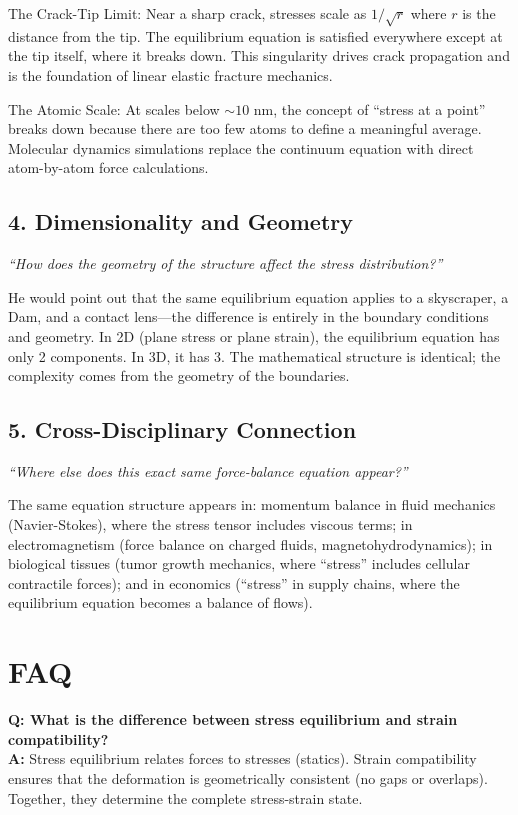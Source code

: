 \documentclass[11pt,openright]{book}
\begin{document}
The Crack-Tip Limit: Near a sharp crack, stresses scale as $1/\sqrt{r}$ where $r$ is the distance from the tip. The equilibrium equation is satisfied everywhere except at the tip itself, where it breaks down. This singularity drives crack propagation and is the foundation of linear elastic fracture mechanics.

The Atomic Scale: At scales below $\sim 10$ nm, the concept of ``stress at a point'' breaks down because there are too few atoms to define a meaningful average. Molecular dynamics simulations replace the continuum equation with direct atom-by-atom force calculations.

\subsection*{4. Dimensionality and Geometry}
\textit{``How does the geometry of the structure affect the stress distribution?''}

He would point out that the same equilibrium equation applies to a skyscraper, a Dam, and a contact lens---the difference is entirely in the boundary conditions and geometry. In 2D (plane stress or plane strain), the equilibrium equation has only 2 components. In 3D, it has 3. The mathematical structure is identical; the complexity comes from the geometry of the boundaries.

\subsection*{5. Cross-Disciplinary Connection}
\textit{``Where else does this exact same force-balance equation appear?''}

The same equation structure appears in: momentum balance in fluid mechanics (Navier-Stokes), where the stress tensor includes viscous terms; in electromagnetism (force balance on charged fluids, magnetohydrodynamics); in biological tissues (tumor growth mechanics, where ``stress'' includes cellular contractile forces); and in economics (``stress'' in supply chains, where the equilibrium equation becomes a balance of flows).
\section*{FAQ}

\textbf{Q: What is the difference between stress equilibrium and strain compatibility?}\\
\textbf{A:} Stress equilibrium relates forces to stresses (statics). Strain compatibility ensures that the deformation is geometrically consistent (no gaps or overlaps). Together, they determine the complete stress-strain state.
\end{document}
